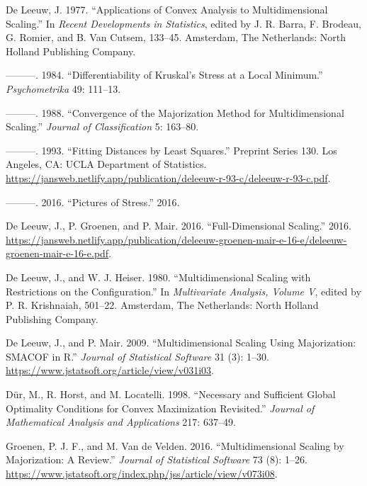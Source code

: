 \documentclass[
  12pt,
]{article}
\newlength{\cslhangindent}
\newenvironment{CSLReferences}[2] %
 {\begin{list}{}{%
  \setlength{\itemindent}{0pt}
  \setlength{\leftmargin}{0pt}
  \setlength{\parsep}{0pt}
  \ifodd #1
   \setlength{\leftmargin}{\cslhangindent}
   \setlength{\itemindent}{-1\cslhangindent}
  \fi
  \setlength{\itemsep}{#2\baselineskip}}}
 {\end{list}}
\begin{document}
\label{refs}
\begin{CSLReferences}{1}{0}
De Leeuw, J. 1977. {``Applications of Convex Analysis to Multidimensional Scaling.''} In \emph{Recent Developments in Statistics}, edited by J. R. Barra, F. Brodeau, G. Romier, and B. Van Cutsem, 133--45. Amsterdam, The Netherlands: North Holland Publishing Company.

---------. 1984. {``{Differentiability of Kruskal's Stress at a Local Minimum}.''} \emph{Psychometrika} 49: 111--13.

---------. 1988. {``Convergence of the Majorization Method for Multidimensional Scaling.''} \emph{Journal of Classification} 5: 163--80.

---------. 1993. {``Fitting Distances by Least Squares.''} Preprint Series 130. Los Angeles, CA: UCLA Department of Statistics. \url{https://jansweb.netlify.app/publication/deleeuw-r-93-c/deleeuw-r-93-c.pdf}.

---------. 2016. {``Pictures of Stress.''} 2016.

De Leeuw, J., P. Groenen, and P. Mair. 2016. {``Full-Dimensional Scaling.''} 2016. \url{https://jansweb.netlify.app/publication/deleeuw-groenen-mair-e-16-e/deleeuw-groenen-mair-e-16-e.pdf}.

De Leeuw, J., and W. J. Heiser. 1980. {``Multidimensional Scaling with Restrictions on the Configuration.''} In \emph{Multivariate Analysis, Volume {V}}, edited by P. R. Krishnaiah, 501--22. Amsterdam, The Netherlands: North Holland Publishing Company.

De Leeuw, J., and P. Mair. 2009. {``{Multidimensional Scaling Using Majorization: SMACOF in R}.''} \emph{Journal of Statistical Software} 31 (3): 1--30. \url{https://www.jstatsoft.org/article/view/v031i03}.

Dür, M., R. Horst, and M. Locatelli. 1998. {``{Necessary and Sufficient Global Optimality Conditions for Convex Maximization Revisited}.''} \emph{Journal of Mathematical Analysis and Applications} 217: 637--49.

Groenen, P. J. F., and M. Van de Velden. 2016. {``{Multidimensional Scaling by Majorization: A Review}.''} \emph{Journal of Statistical Software} 73 (8): 1--26. \url{https://www.jstatsoft.org/index.php/jss/article/view/v073i08}.


\end{CSLReferences}
\end{document}
